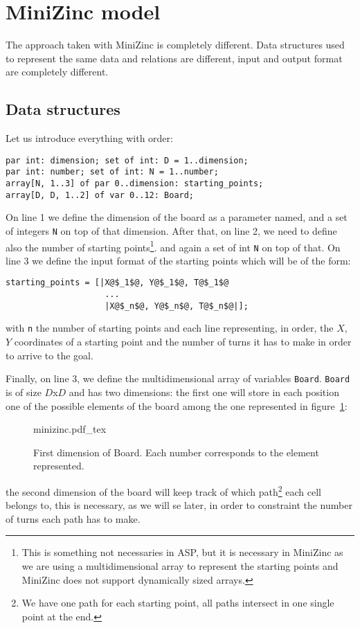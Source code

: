 \section{MiniZinc model}
The approach taken with MiniZinc is completely different. Data structures used to represent the same data and relations are different, input and output format are completely different.
\subsection{Data structures}
Let us introduce everything with order:
\begin{verbatim}
par int: dimension; set of int: D = 1..dimension; 
par int: number; set of int: N = 1..number; 
array[N, 1..3] of par 0..dimension: starting_points; 
array[D, D, 1..2] of var 0..12: Board;
\end{verbatim}

On line 1 we define the dimension of the board as a parameter named, and a set of integers \texttt{N} on top of that dimension.
After that, on line 2, we need to define also the number of starting points\footnote{This is something not necessaries in ASP, but it is necessary in MiniZinc as we are using a multidimensional array to represent the starting points and MiniZinc does not support dynamically sized arrays.}. and again a set of int \texttt{N} on top of that.
On line 3 we define the input format of the starting points which will be of the form:
\begin{verbatim}
starting_points = [|X@$_1$@, Y@$_1$@, T@$_1$@
                    ...
                    |X@$_n$@, Y@$_n$@, T@$_n$@|];
\end{verbatim}
with  \texttt{n} the number of starting points and each line representing, in order, the $X$, $Y$ coordinates of a starting point and the number of turns it has to make in order to arrive to the goal.

Finally, on line 3, we define the multidimensional array of variables \texttt{Board}. \texttt{Board} is of size $D$x$D$ and has two dimensions: the first one will store in each position one of the possible elements of the board among the one represented in figure~\ref{figm:board}:
\begin{figure}[h!]
    \centering
    \def\svgwidth{\columnwidth}
    {minizinc.pdf_tex}
    \caption{First dimension of Board. Each number corresponds to the element represented.}
    \label{figm:board}
\end{figure}
the second dimension of the board will keep track of which path\footnote{We have one path for each starting point, all paths intersect in one single point at the end.} each cell belongs to, this is necessary, as we will se later, in order to constraint the number of turns each path has to make.

